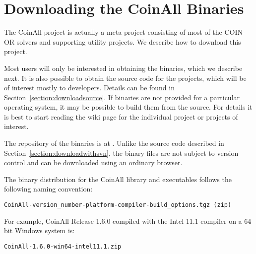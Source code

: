 \section{Downloading the CoinAll Binaries}\label{section:obtainingbinaries}

The CoinAll project is actually a meta-project consisting of most of the COIN-OR solvers and supporting utility projects.  We describe how to download this project. 

Most users will only be interested in obtaining the binaries, which we describe  next.
It is also possible to obtain the source code for the projects, which will be of interest mostly to developers. 
\ifdevelop
Details can be found in  Section~\ref{section:downloadsource}.
\else
If binaries are not provided for a particular operating system, it may be possible to build them from the source.
For details it is best to start reading the wiki page for the individual project or projects of interest.
\fi


The repository of the binaries is at {\tt\UrlCoinAllDownload}.
%
\ifdevelop
 Unlike the source code described in Section~\ref{section:downloadwithsvn}, the binary files 
are not subject to version control and can be downloaded using an ordinary browser. 
\fi

The binary distribution for the CoinAll library and executables follows the following naming convention:


\begin{verbatim}
CoinAll-version_number-platform-compiler-build_options.tgz (zip)
\end{verbatim}
For example, CoinAll  Release 1.6.0 compiled with the Intel 11.1 compiler on a 64 bit Windows system is:
\begin{verbatim}
CoinAll-1.6.0-win64-intel11.1.zip
\end{verbatim}




